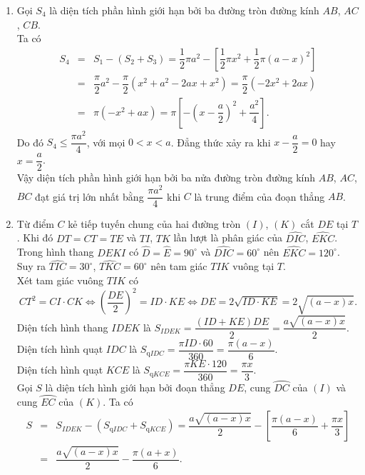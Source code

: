 \begin{bt}
{\begin{enumerate}
\begin{eqnarray*}
				S_2 &=& \dfrac{1}{2}\pi\left(\dfrac{AC}{2}\right)^2 = \dfrac{1}{2}\pi\left(\dfrac{2x}{2}\right)^2 = \dfrac{1}{2}\pi x^2.\\
				S_3 &=& \dfrac{1}{2}\pi\left(\dfrac{CB}{2}\right)^2 = \dfrac{1}{2}\pi\left(\dfrac{AB-AC}{2}\right)^2 = \dfrac{1}{2}\pi\left(\dfrac{2a-2x}{2}\right)^2 = \dfrac{1}{2}\pi (a-x)^2.
			\end{eqnarray*}
			\item Gọi $S_4$ là diện tích phần hình giới hạn bởi ba đường tròn đường kính $AB$, $AC$, $CB$.\\
			Ta có
			\allowdisplaybreaks
			\begin{eqnarray*}
				S_4 &=& S_1-(S_2+S_3) = \dfrac{1}{2}\pi a^2 - \left[\dfrac{1}{2}\pi x^2 + \dfrac{1}{2}\pi (a-x)^2\right]\\
				&=& \dfrac{\pi}{2}a^2 - \dfrac{\pi}{2}(x^2+a^2-2ax+x^2) = \dfrac{\pi}{2}(-2x^2+2ax)\\
				&=& \pi(-x^2+ax) = \pi\left[-\left(x-\dfrac{a}{2}\right)^2 + \dfrac{a^2}{4} \right].
			\end{eqnarray*}
			Do đó $S_4 \leq \dfrac{\pi a^2}{4}$, với mọi $0<x<a$. Đẳng thức xảy ra khi $x-\dfrac{a}{2}=0$ hay $x=\dfrac{a}{2}$.\\
			Vậy diện tích phần hình giới hạn bởi ba nửa đường tròn đường kính $AB$, $AC$, $BC$ đạt giá trị lớn nhất bằng $\dfrac{\pi a^2}{4}$ khi $C$ là trung điểm của đoạn thẳng $AB$.
			\item Từ điểm $C$ kẻ tiếp tuyến chung của hai đường tròn $(I)$, $(K)$ cắt $DE$ tại $T$. Khi đó $DT=CT=TE$ và $TI$, $TK$ lần lượt là phân giác của $\widehat{DIC}$, $\widehat{EKC}$.\\
			Trong hình thang $DEKI$ có $\widehat{D}=\widehat{E}=90^\circ$ và $\widehat{DIC}=60^\circ$ nên $\widehat{EKC}=120^\circ$.\\
			Suy ra $\widehat{TIC}=30^\circ$, $\widehat{TKC}=60^\circ$ nên tam giác $TIK$ vuông tại $T$.\\
			Xét tam giác vuông $TIK$ có
			$$CT^2 = CI \cdot CK \Leftrightarrow \left(\dfrac{DE}{2}\right)^2 = ID \cdot KE \Leftrightarrow DE = 2\sqrt{ID \cdot KE} = 2\sqrt{(a-x)x}.$$
			Diện tích hình thang $IDEK$ là $S_{IDEK} = \dfrac{(ID+KE)DE}{2} = \dfrac{a\sqrt{(a-x)x}}{2}$.\\
			Diện tích hình quạt $IDC$ là $S_{\text{q}IDC} = \dfrac{\pi ID \cdot 60}{360} = \dfrac{\pi(a-x)}{6}$.\\
			Diện tích hình quạt $KCE$ là $S_{\text{q}KCE} = \dfrac{\pi KE \cdot 120}{360} = \dfrac{\pi x}{3}$.\\
			Gọi $S$ là diện tích hình giới hạn bởi đoạn thẳng $DE$, cung $\wideparen{DC}$ của $(I)$ và cung $\wideparen{EC}$ của $(K)$. Ta có
			\begin{eqnarray*}
				S &=& S_{IDEK} - (S_{\text{q}IDC} + S_{\text{q}KCE}) = \dfrac{a\sqrt{(a-x)x}}{2} - \left[\dfrac{\pi(a-x)}{6} + \dfrac{\pi x}{3}\right]\\
				&=& \dfrac{a\sqrt{(a-x)x}}{2} - \dfrac{\pi(a+x)}{6}.
			\end{eqnarray*}
		\end{enumerate}
	}
\end{bt}

